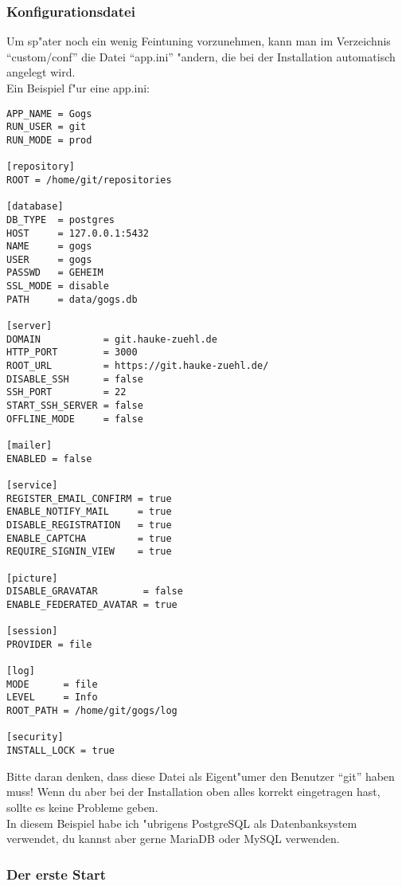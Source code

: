 \documentclass[german,a4paper]{report}
\begin{document}
\subsubsection{Konfigurationsdatei}
Um sp"ater noch ein wenig Feintuning vorzunehmen, kann man im Verzeichnis ``custom/conf''
die Datei ``app.ini'' "andern, die bei der Installation automatisch angelegt wird.\\
Ein Beispiel f"ur eine app.ini:
\begin{verbatim}
APP_NAME = Gogs
RUN_USER = git
RUN_MODE = prod

[repository]
ROOT = /home/git/repositories

[database]
DB_TYPE  = postgres
HOST     = 127.0.0.1:5432
NAME     = gogs
USER     = gogs
PASSWD   = GEHEIM
SSL_MODE = disable
PATH     = data/gogs.db

[server]
DOMAIN           = git.hauke-zuehl.de
HTTP_PORT        = 3000
ROOT_URL         = https://git.hauke-zuehl.de/
DISABLE_SSH      = false
SSH_PORT         = 22
START_SSH_SERVER = false
OFFLINE_MODE     = false

[mailer]
ENABLED = false

[service]
REGISTER_EMAIL_CONFIRM = true
ENABLE_NOTIFY_MAIL     = true
DISABLE_REGISTRATION   = true
ENABLE_CAPTCHA         = true
REQUIRE_SIGNIN_VIEW    = true

[picture]
DISABLE_GRAVATAR        = false
ENABLE_FEDERATED_AVATAR = true

[session]
PROVIDER = file

[log]
MODE      = file
LEVEL     = Info
ROOT_PATH = /home/git/gogs/log

[security]
INSTALL_LOCK = true
\end{verbatim}
Bitte daran denken, dass diese Datei als Eigent"umer den Benutzer ``git'' haben muss!
Wenn du aber bei der Installation oben alles korrekt eingetragen hast, sollte
es keine Probleme geben.\\
In diesem Beispiel habe ich "ubrigens PostgreSQL als Datenbanksystem verwendet, du
kannst aber gerne MariaDB oder MySQL verwenden.

\subsubsection{Der erste Start}
\end{document}
